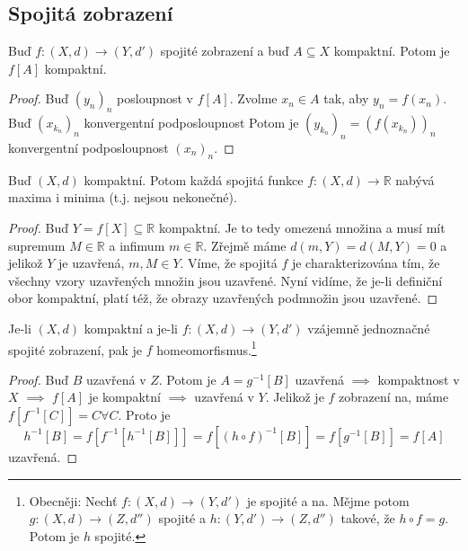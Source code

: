 \documentclass[../main.tex]{subfiles}
\begin{document}
\subsection{Spojitá zobrazení}

\begin{lemma}
	Buď $f: (X,d) \to (Y, d')$ spojité zobrazení a buď $A \subseteq X$ kompaktní. Potom je $f[A]$ kompaktní.
\end{lemma}

\begin{proof}
	Buď $(y_n)_n$ posloupnost v $f[A]$. Zvolme $x_n \in A$ tak, aby $y_n = f(x_n)$. Buď $(x_{k_n})_n$ konvergentní podposloupnost
	Potom je $(y_{k_n})_n = (f(x_{k_n}))_n$ konvergentní podposloupnost $(x_n)_n$.
\end{proof}

\begin{lemma}
	Buď $(X,d)$ kompaktní. Potom každá spojitá funkce $f:(X,d)\to \mathbb{R}$ nabývá maxima i minima (t.j. nejsou nekonečné).
\end{lemma}

\begin{proof}
	Buď $Y = f[X] \subseteq \mathbb{R}$ kompaktní. Je to tedy omezená množina a musí mít supremum $M\in \mathbb{R}$ a infimum $m\in \mathbb{R}$. Zřejmě máme 
	$d(m,Y) = d(M,Y) = 0$ a jelikož $Y$ je uzavřená, $m,M \in Y$. Víme, že spojitá $f$ je charakterizována tím, že všechny vzory uzavřených množin
	jsou uzavřené. Nyní vidíme, že je-li definiční obor kompaktní, platí též, že obrazy uzavřených podmnožin jsou uzavřené. 
\end{proof}


\begin{theorem}
	Je-li $(X,d)$ kompaktní a je-li $f: (X,d) \to (Y,d')$ vzájemně jednoznačné spojité zobrazení, pak je
	$f$ homeomorfismus.\footnote{
	Obecněji: Nechť $f:(X,d) \to (Y,d')$ je spojité a na. Mějme potom $g: (X,d) \to (Z, d'')$ spojité a
	$h: (Y,d') \to (Z,d'')$ takové, že $h \circ f = g$. Potom je $h$ spojité.}
\end{theorem}

\begin{proof}
	Buď $B$ uzavřená v $Z$. Potom je $A = g^{-1}[B]$ uzavřená $\implies$ kompaktnost v $X$ $\implies$ $f[A]$ je kompaktní $\implies$ uzavřená v $Y$. Jelikož  je $f$ zobrazení na, máme $f[f^{-1}[C]] = C \forall C$. Proto je 
	\[h^{-1}[B] = f[f^{-1}[h^{-1}[B]]] = f[(h \circ f)^{-1}[B]] = f[g^{-1}[B]] = f[A]\]
	uzavřená.
\end{proof}
\end{document}
